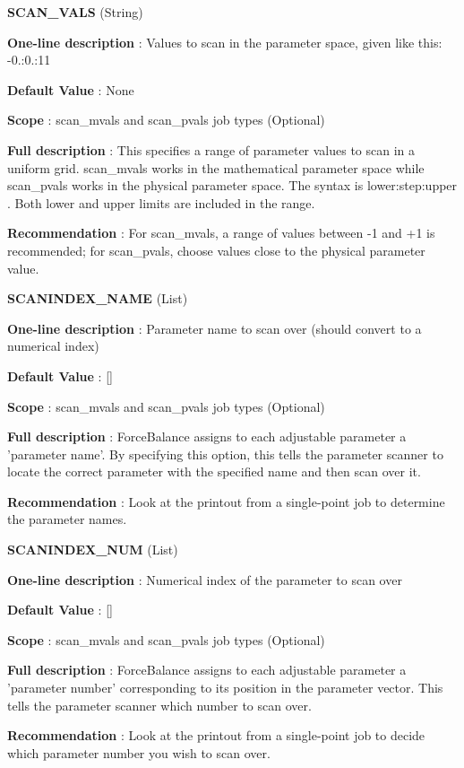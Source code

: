 \begin{DoxyItemize}
\item {\bfseries  S\-C\-A\-N\-\_\-\-V\-A\-L\-S } (String) \par
{\bfseries  One-\/line description }\-: Values to scan in the parameter space, given like this\-: -\/0.\-:0.\-:11 \par
{\bfseries  Default Value }\-: None \par
{\bfseries  Scope }\-: scan\-\_\-mvals and scan\-\_\-pvals job types (Optional) \par
{\bfseries  Full description }\-: This specifies a range of parameter values to scan in a uniform grid. scan\-\_\-mvals works in the mathematical parameter space while scan\-\_\-pvals works in the physical parameter space. The syntax is lower\-:step\-:upper . Both lower and upper limits are included in the range. \par
{\bfseries  Recommendation }\-: For scan\-\_\-mvals, a range of values between -\/1 and +1 is recommended; for scan\-\_\-pvals, choose values close to the physical parameter value.\end{DoxyItemize}
\begin{DoxyItemize}
\item {\bfseries  S\-C\-A\-N\-I\-N\-D\-E\-X\-\_\-\-N\-A\-M\-E } (List) \par
{\bfseries  One-\/line description }\-: Parameter name to scan over (should convert to a numerical index) \par
{\bfseries  Default Value }\-: \mbox{[}\mbox{]} \par
{\bfseries  Scope }\-: scan\-\_\-mvals and scan\-\_\-pvals job types (Optional) \par
{\bfseries  Full description }\-: Force\-Balance assigns to each adjustable parameter a 'parameter name'. By specifying this option, this tells the parameter scanner to locate the correct parameter with the specified name and then scan over it. \par
{\bfseries  Recommendation }\-: Look at the printout from a single-\/point job to determine the parameter names.\end{DoxyItemize}
\begin{DoxyItemize}
\item {\bfseries  S\-C\-A\-N\-I\-N\-D\-E\-X\-\_\-\-N\-U\-M } (List) \par
{\bfseries  One-\/line description }\-: Numerical index of the parameter to scan over \par
{\bfseries  Default Value }\-: \mbox{[}\mbox{]} \par
{\bfseries  Scope }\-: scan\-\_\-mvals and scan\-\_\-pvals job types (Optional) \par
{\bfseries  Full description }\-: Force\-Balance assigns to each adjustable parameter a 'parameter number' corresponding to its position in the parameter vector. This tells the parameter scanner which number to scan over. \par
{\bfseries  Recommendation }\-: Look at the printout from a single-\/point job to decide which parameter number you wish to scan over.\end{DoxyItemize}
